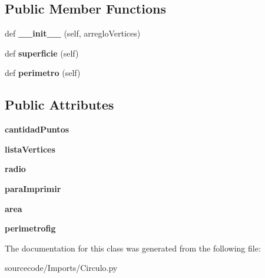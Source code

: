 \subsection*{Public Member Functions}
\begin{DoxyCompactItemize}
\item 
\mbox{\label{class_imports_1_1_circulo_1_1_circulo_a90287ae374f2d878fe06eb7216a8d8f1}} 
def {\bfseries \+\_\+\+\_\+init\+\_\+\+\_\+} (self, arreglo\+Vertices)
\item 
\mbox{\label{class_imports_1_1_circulo_1_1_circulo_adea3a7929a35ba35da26bf85ccc1cf8f}} 
def {\bfseries superficie} (self)
\item 
\mbox{\label{class_imports_1_1_circulo_1_1_circulo_ac6de431753ff0ad18300c9d40c2b770e}} 
def {\bfseries perimetro} (self)
\end{DoxyCompactItemize}
\subsection*{Public Attributes}
\begin{DoxyCompactItemize}
\item 
\mbox{\label{class_imports_1_1_circulo_1_1_circulo_a175156b15659fcd292d8fbe58fdf969b}} 
{\bfseries cantidad\+Puntos}
\item 
\mbox{\label{class_imports_1_1_circulo_1_1_circulo_a46cb935cbe3cc97bc12f1a1ebf550245}} 
{\bfseries lista\+Vertices}
\item 
\mbox{\label{class_imports_1_1_circulo_1_1_circulo_ae475f236c5ad145218abda4272137fef}} 
{\bfseries radio}
\item 
\mbox{\label{class_imports_1_1_circulo_1_1_circulo_a5073418c67dc687d23ec5aadb638ae33}} 
{\bfseries para\+Imprimir}
\item 
\mbox{\label{class_imports_1_1_circulo_1_1_circulo_a1dfc20a0297e0f52ab8e9e6da90af79b}} 
{\bfseries area}
\item 
\mbox{\label{class_imports_1_1_circulo_1_1_circulo_a44f63cbe287165b871274309cbb85c98}} 
{\bfseries perimetrofig}
\end{DoxyCompactItemize}


The documentation for this class was generated from the following file\+:\begin{DoxyCompactItemize}
\item 
sourcecode/\+Imports/Circulo.\+py\end{DoxyCompactItemize}
